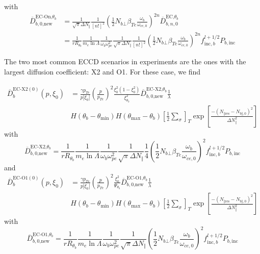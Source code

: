 with
\begin{align}
\overline{D}_{b,0\text{,new}}^{\text{EC-On,}\theta_{b}} &  =\frac{1}{\sqrt
{\pi}\Delta N_{\Vert}}\frac{1}{\left[  n!\right]  ^{2}}\left(  \frac{1}%
{2}N_{b\bot}\beta_{Te}\frac{\omega_{b}}{\omega_{ce,0}}\right)  ^{2n}%
\overline{D}_{b,n,0}^{\text{EC,}\theta_{b}}\\
&  =\frac{1}{rR_{\theta_{b}}}\frac{1}{m_{e}\ln\Lambda}\frac{1}{\omega
_{b}\omega_{pe}^{2}}\frac{1}{\sqrt{\pi}\Delta N_{\Vert}}\frac{1}{\left[
n!\right]  ^{2}}\left(  \frac{1}{2}N_{b\bot}\beta_{Te}\frac{\omega_{b}}%
{\omega_{ce,0}}\right)  ^{2n}f_{\text{inc},b}^{l+1/2}P_{b,\text{inc}}%
\end{align}

The two most common ECCD scenarios in experiments are the ones with the
largest diffusion coefficient: X2 and O1. For these case, we find%

\begin{align}
\overline{D}_{b}^{\text{EC-X2}(0)}(p,\xi_{0}) &  =\frac{\gamma p_{Te}%
}{p\left|  \xi_{0}\right|  }\left(  \frac{p}{p_{Te}}\right)  ^{2}\frac{\xi
_{0}^{2}\left(  1-\xi_{0}^{2}\right)  }{\xi_{\theta_{b}}^{2}}\overline
{D}_{b,0\text{,new}}^{\text{EC-X2,}\theta_{b}}\frac{1}{\lambda}\nonumber\\
&  H\left(  \theta_{b}-\theta_{\min}\right)  H\left(  \theta_{\max}-\theta
_{b}\right)  \left[  \frac{1}{2}\sum\limits_{\sigma}\right]  _{T}\exp\left[
\frac{-\left(  N_{\Vert\text{res}}-N_{b\Vert,0}\right)  ^{2}}{\Delta N_{\Vert
}^{2}}\right]
\end{align}
with
\begin{equation}
\overline{D}_{b,0\text{,new}}^{\text{EC-X2,}\theta_{b}}=\frac{1}%
{rR_{\theta_{b}}}\frac{1}{m_{e}\ln\Lambda}\frac{1}{\omega_{b}\omega_{pe}^{2}%
}\frac{1}{\sqrt{\pi}\Delta N_{\Vert}}\frac{1}{4}\left(  \frac{1}{2}N_{b\bot
}\beta_{Te}\frac{\omega_{b}}{\omega_{ce,0}}\right)  ^{2}f_{\text{inc}%
,b}^{l+1/2}P_{b,\text{inc}}%
\end{equation}
and%
\begin{align}
\overline{D}_{b}^{\text{EC-O1}(0)}(p,\xi_{0}) &  =\frac{\gamma p_{Te}%
}{p\left|  \xi_{0}\right|  }\left(  \frac{p}{p_{Te}}\right)  ^{2}\frac{\xi
_{0}^{2}}{\Psi_{\theta_{b}}}\overline{D}_{b,0\text{,new}}^{\text{EC-O1,}%
\theta_{b}}\frac{1}{\lambda}\nonumber\\
&  H\left(  \theta_{b}-\theta_{\min}\right)  H\left(  \theta_{\max}-\theta
_{b}\right)  \left[  \frac{1}{2}\sum\limits_{\sigma}\right]  _{T}\exp\left[
\frac{-\left(  N_{\Vert\text{res}}-N_{b\Vert,0}\right)  ^{2}}{\Delta N_{\Vert
}^{2}}\right]
\end{align}
with
\begin{equation}
\overline{D}_{b,0\text{,new}}^{\text{EC-O1,}\theta_{b}}=\frac{1}%
{rR_{\theta_{b}}}\frac{1}{m_{e}\ln\Lambda}\frac{1}{\omega_{b}\omega_{pe}^{2}%
}\frac{1}{\sqrt{\pi}\Delta N_{\Vert}}\left(  \frac{1}{2}N_{b\bot}\beta
_{Te}\frac{\omega_{b}}{\omega_{ce,0}}\right)  ^{2}f_{\text{inc},b}%
^{l+1/2}P_{b,\text{inc}}%
\end{equation}
